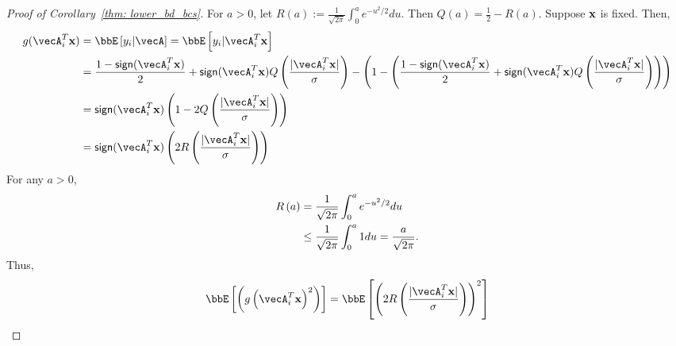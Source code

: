 \begin{proof}[Proof of Corollary~\ref{thm: lower_bd_bcs}]
For $a>0$, let $R(a):=\frac{1}{\sqrt{2\pi}}\int_{0}^{a}e^{-u^2/2}du$. Then $Q(a) = \frac{1}{2}-R(a)$. Suppose $\mathbf{x}$ is fixed. Then,
\begin{align*}
g(\vecA_i^T\bx) & =\bbE\insq{y_i|\vecA}  = \bbE\insq{y_i|\vecA_i^T\bx}\\
& = \frac{1- \sign{\vecA_i^T\bx}}{2} + \sign{\vecA_i^T\bx}Q\inp{\frac{|\vecA_i^T\bx|}{\sigma}} - \inp{1-\inp{\frac{1- \sign{\vecA_i^T\bx}}{2} + \sign{\vecA_i^T\bx}Q\inp{\frac{|\vecA_i^T\bx|}{\sigma}}}}\\
& = \sign{\vecA_i^T\bx}\inp{1-2Q\inp{\frac{|\vecA_i^T\bx|}{\sigma}}}\\
& = \sign{\vecA_i^T\bx}\inp{2R\inp{\frac{|\vecA_i^T\bx|}{\sigma}}}
\end{align*}
For any $a>0$,
\begin{align*}
R\left(a\right) &= \frac{1}{\sqrt{2\pi}}\int_{0}^{a}e^{-u^2/2}du\\
& \leq \frac{1}{\sqrt{2\pi}}\int_{0}^{a}1du = \frac{a}{\sqrt{2\pi}}.
\end{align*}
Thus, 
\begin{align*}
\bbE\insq{\inp{g\inp{\vecA_i^T\bx}^2}} &= \bbE\insq{\inp{2R\inp{\frac{|\vecA_i^T\bx|}{\sigma}}}^2}\\

\end{align*}
\end{proof}
